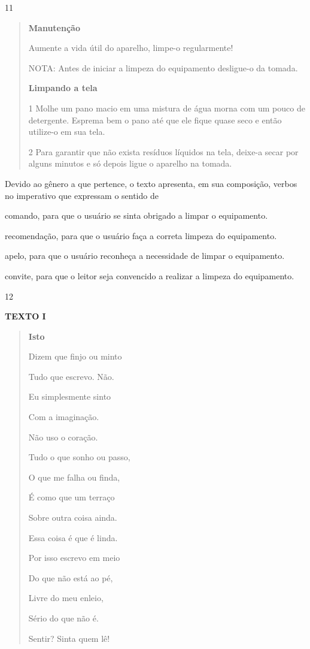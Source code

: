 \num{11}

\begin{quote}\textbf{Manutenção}

Aumente a vida útil do aparelho, limpe-o regularmente!

NOTA: Antes de iniciar a limpeza do equipamento desligue-o da tomada.

\textbf{Limpando a tela}

\num{1} Molhe um pano macio em uma mistura de água morna com um pouco de
detergente. Esprema bem o pano até que ele fique quase seco e então
utilize-o em sua tela.

\num{2} Para garantir que não exista resíduos líquidos na tela, deixe-a
secar por alguns minutos e só depois ligue o aparelho na tomada.
\end{quote}


Devido ao gênero a que pertence, o texto apresenta, em sua composição,
verbos no imperativo que expressam o sentido de

\begin{escolha}
\item comando, para que o usuário se sinta obrigado a limpar o equipamento.

\item recomendação, para que o usuário faça a correta limpeza do
equipamento.

\item apelo, para que o usuário reconheça a necessidade de limpar o
equipamento.

\item convite, para que o leitor seja convencido a realizar a limpeza do
equipamento.
\end{escolha}

\num{12}

\textbf{TEXTO I}

\begin{quote}

\textbf{Isto}

Dizem que finjo ou minto

Tudo que escrevo. Não.

Eu simplesmente sinto

Com a imaginação.

Não uso o coração.

Tudo o que sonho ou passo,

O que me falha ou finda,

É como que um terraço

Sobre outra coisa ainda.

Essa coisa é que é linda.

Por isso escrevo em meio

Do que não está ao pé,

Livre do meu enleio,

Sério do que não é.

Sentir? Sinta quem lê!
\end{quote}

